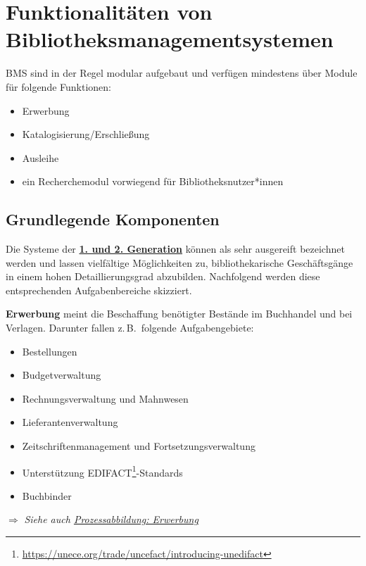 \documentclass[
  11pt,
  letterpaper,
  DIV=11,
  twoside]{scrreprt}
\DeclareRobustCommand{\href}[2]{#2\footnote{\url{#1}}}
\begin{document}
\section{Funktionalitäten von
Bibliotheksmanagementsystemen}\label{funktionalituxe4ten-von-bibliotheksmanagementsystemen}

BMS sind in der Regel modular aufgebaut und verfügen mindestens über
Module für folgende Funktionen:

\begin{itemize}
\item
  Erwerbung
\item
  Katalogisierung/Erschließung
\item
  Ausleihe
\item
  ein Recherchemodul vorwiegend für Bibliotheksnutzer*innen
\end{itemize}

\subsection{Grundlegende Komponenten}\label{grundlegende-komponenten}

Die Systeme der
\hyperref[geschichte-der-bibliotheksmanagementsysteme]{\textbf{1. und 2.
Generation}} können als sehr ausgereift bezeichnet werden und lassen
vielfältige Möglichkeiten zu, bibliothekarische Geschäftsgänge in einem
hohen Detaillierungsgrad abzubilden. Nachfolgend werden diese
entsprechenden Aufgabenbereiche skizziert.

\textbf{Erwerbung} meint die Beschaffung benötigter Bestände im
Buchhandel und bei Verlagen. Darunter fallen z.\,B.~folgende
Aufgabengebiete:

\begin{itemize}
\item
  Bestellungen
\item
  Budgetverwaltung
\item
  Rechnungsverwaltung und Mahnwesen
\item
  Lieferantenverwaltung
\item
  Zeitschriftenmanagement und Fortsetzungsverwaltung
\item
  Unterstützung
  \href{https://unece.org/trade/uncefact/introducing-unedifact}{EDIFACT}-Standards
\item
  Buchbinder
\end{itemize}

\(\Rightarrow\) \emph{Siehe auch
\hyperref[erwerbung-prozess]{Prozessabbildung: Erwerbung}}
\end{document}
